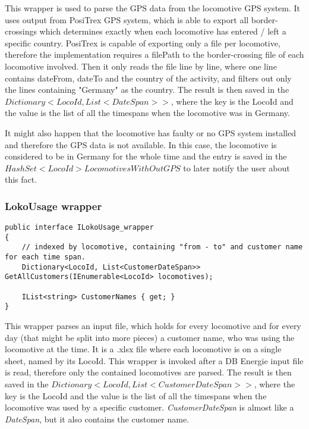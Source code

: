 \documentclass[11pt]{article}
\begin{document}
This wrapper is used to parse the GPS data from the locomotive GPS system. It uses output from PosiTrex GPS system, which is able to export all border-crossings which determines exactly when each locomotive has entered / left a specific country. PosiTrex is capable of exporting only a file per locomotive, therefore the implementation requires a filePath to the border-crossing file of each locomotive involved. Then it only reads the file line by line, where one line contains dateFrom, dateTo and the country of the activity, and filters out only the lines containing "Germany" as the country. The result is then saved in the \begin{math}Dictionary<LocoId, List<DateSpan>>\end{math}, where the key is the LocoId and the value is the list of all the timespans when the locomotive was in Germany.

It might also happen that the locomotive has faulty or no GPS system installed and therefore the GPS data is not available. In this case, the locomotive is considered to be in Germany for the whole time and the entry is saved in the \begin{math}HashSet<LocoId>LocomotivesWithOutGPS\end{math} to later notify the user about this fact.

\subsubsection{LokoUsage wrapper}
\label{sec:LokoUsageWrapper}

\begin{verbatim}
public interface ILokoUsage_wrapper
{
    // indexed by locomotive, containing "from - to" and customer name for each time span.
    Dictionary<LocoId, List<CustomerDateSpan>> GetAllCustomers(IEnumerable<LocoId> locomotives);

    IList<string> CustomerNames { get; }
}
\end{verbatim}

This wrapper parses an input file, which holds for every locomotive and for every day (that might be split into more pieces) a customer name, who was using the locomotive at the time. It is a .xlsx file where each locomotive is on a single sheet, named by its LocoId. This wrapper is invoked after a DB Energie input file is read, therefore only the contained locomotives are parsed. The result is then saved in the \begin{math}Dictionary<LocoId, List<CustomerDateSpan>>\end{math}, where the key is the LocoId and the value is the list of all the timespans when the locomotive was used by a specific customer. \textit{CustomerDateSpan} is almost like a \textit{DateSpan}, but it also contains the customer name.
\end{document}
